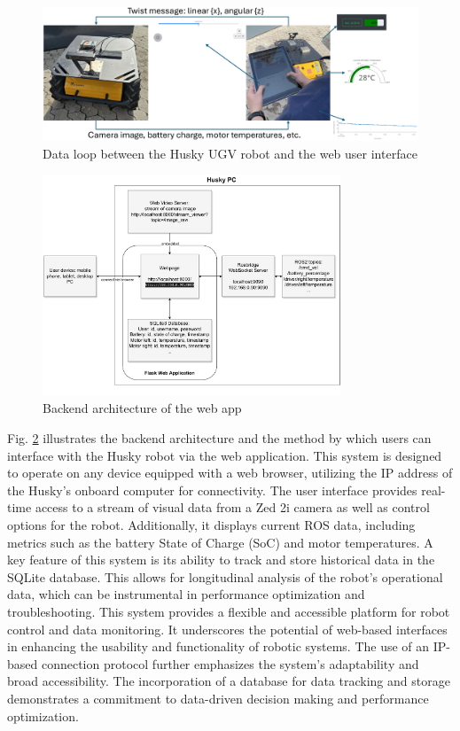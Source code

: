 \documentclass[conference]{IEEEtran}
\begin{document}
\begin{figure}[htbp]
    \centerline{\includegraphics[width=18.2cm]{Pictures/loop.png}}
    \caption{Data loop between the Husky UGV robot and the web user interface}
    \label{fig:loop}
\end{figure}

\begin{figure}[htbp]
    \centerline{\includegraphics[width=8.9cm]{Pictures/userapp.pdf}}
    \caption{Backend architecture of the web app}
    \label{fig:userapp}
\end{figure}
Fig. \ref{fig:userapp} illustrates the backend architecture and the method by which users can interface with the Husky robot via the web application. This system is designed to operate on any device equipped with a web browser, utilizing the IP address of the Husky's onboard computer for connectivity.
The user interface provides real-time access to a stream of visual data from a Zed 2i camera as well as control options for the robot. Additionally, it displays current ROS data, including metrics such as the battery State of Charge (SoC) and motor temperatures.
A key feature of this system is its ability to track and store historical data in the SQLite database. This allows for longitudinal analysis of the robot's operational data, which can be instrumental in performance optimization and troubleshooting.
This system provides a flexible and accessible platform for robot control and data monitoring. It underscores the potential of web-based interfaces in enhancing the usability and functionality of robotic systems. 
The use of an IP-based connection protocol further emphasizes the system's adaptability and broad accessibility. The incorporation of a database for data tracking and storage demonstrates a commitment to data-driven decision making and performance optimization. 
\end{document}
